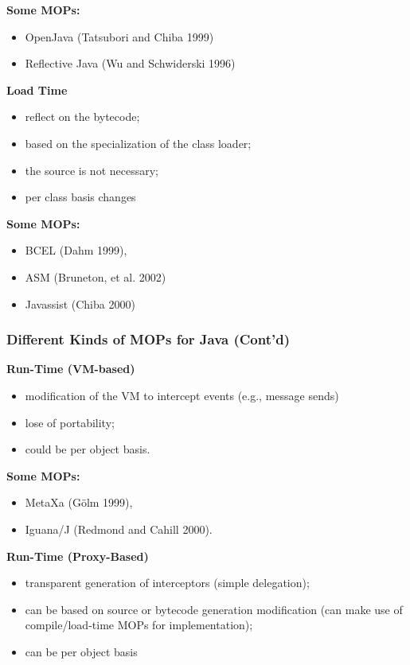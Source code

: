 \textbf{Some MOPs:}

\begin{itemize}
	\item OpenJava (Tatsubori and Chiba 1999)
	\item Reflective Java (Wu and Schwiderski 1996)
\end{itemize}

\textbf{Load Time}

\begin{itemize}
	\item reflect on the bytecode;
	\item based on the specialization of the class loader;
	\item the source is not necessary;
	\item per class basis changes
\end{itemize}

\textbf{Some MOPs:}

\begin{itemize}
	\item BCEL (Dahm 1999), 
	\item ASM (Bruneton, et al. 2002)
	\item Javassist (Chiba 2000)
\end{itemize}

\subsubsection{Different Kinds of MOPs for Java (Cont'd)}

\textbf{Run-Time (VM-based)}

\begin{itemize}
	\item modification of the VM to intercept events (e.g., message sends)
	\item lose of portability;
	\item could be per object basis.
\end{itemize}

\textbf{Some MOPs:}

\begin{itemize}
	\item MetaXa (Gölm 1999), 
	\item Iguana/J (Redmond and Cahill 2000).
\end{itemize}

\textbf{Run-Time (Proxy-Based)}

\begin{itemize}
	\item transparent generation of interceptors (simple delegation);
	\item can be based on source or bytecode generation modification (can make use of compile/load-time MOPs for implementation);
	\item can be per object basis
\end{itemize}

